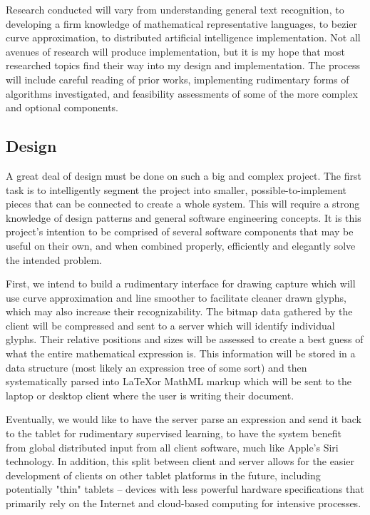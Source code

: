 \documentclass{acm_proc_article-sp}
\begin{document}
Research conducted will vary from understanding general text recognition, to developing a firm knowledge of mathematical representative languages, to bezier curve approximation, to distributed artificial intelligence implementation. Not all avenues of research will produce implementation, but it is my hope that most researched topics find their way into my design and implementation. The process will include careful reading of prior works, implementing rudimentary forms of algorithms investigated, and feasibility assessments of some of the more complex and optional components.

\subsection{Design}
A great deal of design must be done on such a big and complex project. The first task is to intelligently segment the project into smaller, possible-to-implement pieces that can be connected to create a whole system. This will require a strong knowledge of design patterns and general software engineering concepts. It is this project's intention to be comprised of several software components that may be useful on their own, and when combined properly, efficiently and elegantly solve the intended problem.  

First, we intend to build a rudimentary interface for drawing capture which will use curve approximation and line smoother to facilitate cleaner drawn glyphs, which may also increase their recognizability. The bitmap data gathered by the client will be compressed and sent to a server which will identify individual glyphs. Their relative positions and sizes will be assessed to create a best guess of what the entire mathematical expression is. This information will be stored in a data structure (most likely an expression tree of some sort) and then systematically parsed into \LaTeX or MathML markup which will be sent to the laptop or desktop client where the user is writing their document.

Eventually, we would like to have the server parse an expression and send it back to the tablet for rudimentary supervised learning, to have the system benefit from global distributed input from all client software, much like Apple's Siri technology. In addition, this split between client and server allows for the easier development of clients on other tablet platforms in the future, including potentially "thin" tablets -- devices with less powerful hardware specifications that primarily rely on the Internet and cloud-based computing for intensive processes.
\end{document}
